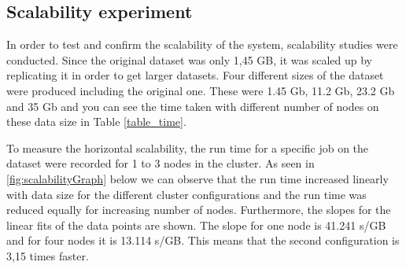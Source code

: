



\subsection{Scalability experiment}
In order to test and confirm the scalability of the system, scalability studies were conducted. Since the original dataset was only 1,45 GB, it was scaled up by replicating it in order to get larger datasets. Four different sizes of the dataset were produced including the original one. These were 1.45 Gb, 11.2 Gb, 23.2 Gb and 35 Gb and you can see the time taken with different number of nodes on these data size in Table \ref{table_time}.

To measure the horizontal scalability, the run time for a specific job on the dataset were recorded for 1 to 3 nodes in the cluster. As seen in  \ref{fig:scalabilityGraph} below we can observe that
the run time increased linearly with data size for the different cluster configurations and the run time was reduced equally for increasing number of nodes. Furthermore, the slopes for the linear fits of the data points are shown. The slope for one node is 41.241 s/GB and for four nodes it is 13.114 s/GB. This means that the second configuration is 3,15 times faster.\\

